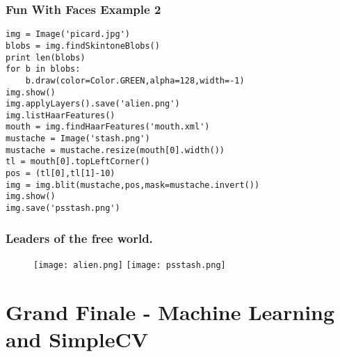\documentclass[compress]{beamer}
\begin{document}
\begin{frame}[fragile] 
\frametitle{Fun With Faces Example 2}
\begin{example}
\begin{verbatim}
img = Image('picard.jpg')
blobs = img.findSkintoneBlobs()
print len(blobs)
for b in blobs:
    b.draw(color=Color.GREEN,alpha=128,width=-1)
img.show()
img.applyLayers().save('alien.png')
img.listHaarFeatures()
mouth = img.findHaarFeatures('mouth.xml')
mustache = Image('stash.png')
mustache = mustache.resize(mouth[0].width())
tl = mouth[0].topLeftCorner()
pos = (tl[0],tl[1]-10)
img = img.blit(mustache,pos,mask=mustache.invert())
img.show()
img.save('psstash.png')
\end{verbatim}
\end{example}
\end{frame} 
\begin{frame}
\frametitle{Leaders of the free world.}
 \begin{figure}
     \texttt{[image: alien.png]}
     \quad
     \texttt{[image: psstash.png]}
 \end{figure}
\end{frame}
 \section{Grand Finale - Machine Learning and SimpleCV}
\end{document}
